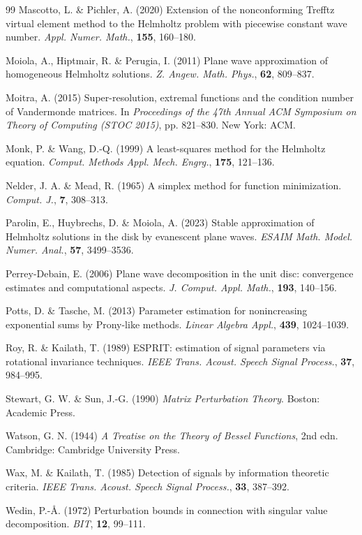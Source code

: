 \documentclass[11pt]{article}
\numberwithin{equation}{section}
\begin{document}
\begin{thebibliography}{99}
Mascotto, L. \& Pichler, A. (2020) Extension of the nonconforming Trefftz virtual element method to the Helmholtz problem with piecewise constant wave number. \emph{Appl. Numer. Math.}, \textbf{155}, 160--180.

Moiola, A., Hiptmair, R. \& Perugia, I. (2011) Plane wave approximation of homogeneous Helmholtz solutions. \emph{Z. Angew. Math. Phys.}, \textbf{62}, 809--837.

Moitra, A. (2015) Super-resolution, extremal functions and the condition number of Vandermonde matrices. In \emph{Proceedings of the 47th Annual ACM Symposium on Theory of Computing (STOC 2015)}, pp. 821--830. New York: ACM.

Monk, P. \& Wang, D.-Q. (1999) A least-squares method for the Helmholtz equation. \emph{Comput. Methods Appl. Mech. Engrg.}, \textbf{175}, 121--136.

Nelder, J. A. \& Mead, R. (1965) A simplex method for function minimization. \emph{Comput. J.}, \textbf{7}, 308--313.

Parolin, E., Huybrechs, D. \& Moiola, A. (2023) Stable approximation of Helmholtz solutions in the disk by evanescent plane waves. \emph{ESAIM Math. Model. Numer. Anal.}, \textbf{57}, 3499--3536.

Perrey-Debain, E. (2006) Plane wave decomposition in the unit disc: convergence estimates and computational aspects. \emph{J. Comput. Appl. Math.}, \textbf{193}, 140--156.

Potts, D. \& Tasche, M. (2013) Parameter estimation for nonincreasing exponential sums by Prony-like methods. \emph{Linear Algebra Appl.}, \textbf{439}, 1024--1039.

Roy, R. \& Kailath, T. (1989) ESPRIT: estimation of signal parameters via rotational invariance techniques. \emph{IEEE Trans. Acoust. Speech Signal Process.}, \textbf{37}, 984--995.

Stewart, G. W. \& Sun, J.-G. (1990) \emph{Matrix Perturbation Theory}. Boston: Academic Press.

Watson, G. N. (1944) \emph{A Treatise on the Theory of Bessel Functions}, 2nd edn. Cambridge: Cambridge University Press.

Wax, M. \& Kailath, T. (1985) Detection of signals by information theoretic criteria. \emph{IEEE Trans. Acoust. Speech Signal Process.}, \textbf{33}, 387--392.

Wedin, P.-\AA. (1972) Perturbation bounds in connection with singular value decomposition. \emph{BIT}, \textbf{12}, 99--111.
\end{thebibliography}
\end{document}

